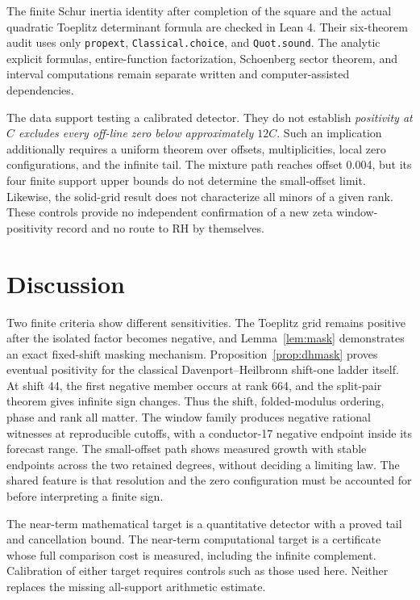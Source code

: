 \documentclass[11pt]{article}
\theoremstyle{remark}
\begin{document}
The finite Schur inertia identity after completion of the square and the
actual quadratic Toeplitz determinant formula are checked in Lean 4.
Their six-theorem audit uses only \texttt{propext},
\texttt{Classical.choice}, and \texttt{Quot.sound}.
The analytic explicit formulas, entire-function factorization, Schoenberg
sector theorem, and interval computations remain separate written and
computer-assisted dependencies.

The data support testing a calibrated detector. They do not establish
\emph{positivity at \(C\) excludes every off-line zero below approximately
\(12C\)}. Such an implication additionally requires a uniform theorem over
offsets, multiplicities, local zero configurations, and the infinite tail.
The mixture path reaches offset 0.004, but its four finite support upper
bounds do not determine the small-offset limit. Likewise, the solid-grid result does
not characterize all minors of a given rank. These controls provide no
independent confirmation of a new zeta window-positivity record and no route
to RH by themselves.

\section{Discussion}
Two finite criteria show different sensitivities. The Toeplitz grid remains
positive after the isolated factor becomes negative, and
Lemma~\ref{lem:mask} demonstrates an exact fixed-shift masking mechanism.
Proposition~\ref{prop:dhmask} proves eventual positivity for the classical
Davenport--Heilbronn shift-one ladder itself. At shift 44, the first negative
member occurs at rank 664, and the split-pair theorem gives infinite sign
changes. Thus the shift, folded-modulus ordering, phase and rank all matter.
The window family produces negative rational witnesses at reproducible
cutoffs, with a conductor-17 negative endpoint inside its forecast range.
The small-offset path shows measured growth with stable endpoints across
the two retained degrees, without deciding a limiting law. The shared
feature is that resolution and the zero configuration must be
accounted for before interpreting a finite sign.

The near-term mathematical target is a quantitative detector with a proved
tail and cancellation bound. The near-term computational target is a
certificate whose full comparison cost is measured, including the
infinite complement. Calibration of either target requires controls such
as those used here. Neither replaces the missing all-support arithmetic
estimate.
\end{document}
